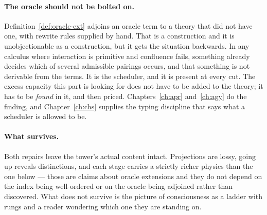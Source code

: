 \paragraph{The oracle should not be bolted on.}
Definition~\ref{def:oracle-ext} adjoins an oracle term to a theory that
did not have one, with rewrite rules supplied by hand.
That is a construction and it is unobjectionable as a construction, but
it gets the situation backwards.
In any calculus where interaction is primitive and confluence fails,
something already decides which of several admissible pairings occurs,
and that something is not derivable from the terms.
It is the scheduler, and it is present at every cut.
The excess capacity this part is looking for does not have to be added
to the theory; it has to be \emph{found} in it, and then priced.
Chapters~\ref{ch:apr} and~\ref{ch:agy} do the finding, and
Chapter~\ref{ch:chs} supplies the typing discipline that says what a
scheduler is allowed to be.

\paragraph{What survives.}
Both repairs leave the tower's actual content intact.
Projections are lossy, going up reveals distinctions, and each stage
carries a strictly richer physics than the one below --- those are
claims about oracle extensions and they do not depend on the index being
well-ordered or on the oracle being adjoined rather than discovered.
What does not survive is the picture of consciousness as a ladder with
rungs and a reader wondering which one they are standing on.

